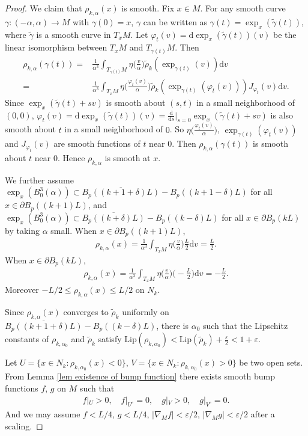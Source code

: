 \documentclass[11pt]{amsart}
\numberwithin{equation}{section}
\renewcommand{\d}{\mathrm{d}}
\begin{document}
\begin{proof}
We claim that $\rho_{k,\alpha}(x)$ is smooth. Fix $x\in M$. For any smooth curve $\gamma:(-\alpha,\alpha)\to M$ with $\gamma(0)=x$, $\gamma$ can be written as $\gamma(t)=\exp_x(\tilde\gamma(t))$, where $\tilde\gamma$ is a smooth curve in $T_xM$. Let $\varphi_t(v)=\d\exp_x(\tilde\gamma(t))(v)$ be the linear isomorphism between $T_xM$ and $T_{\gamma(t)}M$. Then 
\begin{align*}
    \rho_{k,\alpha}(\gamma(t))=&\frac{1}{\alpha^3}\int_{T_{\gamma(t)}M}\eta\Big(\frac{v}{\alpha}\Big)\tilde\rho_k(\exp_{\gamma(t)} (v))\d v\\
    =&\frac{1}{\alpha^3}\int_{T_xM}\eta\Big(\frac{\varphi_t(v)}{\alpha}\Big)\tilde\rho_k(\exp_{\gamma(t)} (\varphi_t(v)))J_{\varphi_t}(v)\d v.
\end{align*}
Since $\exp_x(\tilde\gamma(t)+sv)$ is smooth about $(s,t)$ in a small neighborhood of $(0,0)$, $\varphi_t(v)=\d\exp_x(\tilde\gamma(t))(v)=\frac{\d}{\d s}|_{s=0}\exp_x(\tilde\gamma(t)+sv)$ is also smooth about $t$ in a small neighborhood of $0$. So $\eta\Big(\frac{\varphi_t(v)}{\alpha}\Big)$, $\exp_{\gamma(t)} (\varphi_t(v))$ and $J_{\varphi_t}(v)$ are smooth functions of $t$ near $0$. Then $\rho_{k,\alpha}(\gamma(t))$ is smooth about $t$ near $0$.  Hence $\rho_{k,\alpha}$ is smooth at $x$. 

We further assume $\exp_x(B_0^3(\alpha))\subset\overline{B_p((k+1+\delta)L)}- B_p((k+1-\delta)L)$ for all $x\in\partial B_p((k+1)L)$, and $\exp_x(B_0^3(\alpha))\subset\overline{B_p((k+\delta)L)}- B_p((k-\delta)L)$ for all $x\in\partial B_p(kL)$ by taking $\alpha$ small. When $x\in\partial B_p((k+1)L)$,
\begin{align*}
    \rho_{k,\alpha}(x)=\frac{1}{\alpha^3}\int_{T_xM}\eta\Big(\frac{v}{\alpha}\Big)\frac{L}{2}\d v=\frac{L}{2}.
\end{align*}
When $x\in\partial B_p(kL)$,
\begin{align*}
    \rho_{k,\alpha}(x)=\frac{1}{\alpha^3}\int_{T_xM}\eta\Big(\frac{v}{\alpha}\Big)\Big(-\frac{L}{2}\Big)\d v=-\frac{L}{2}.
\end{align*}
Moreover $-L/2\leq \rho_{k,\alpha}(x)\leq L/2$ on $N_k$.

Since $\rho_{k,\alpha}(x)$ converges to $\tilde\rho_k$ uniformly on $\overline{B_p((k+1+\delta)L)}- B_p((k-\delta)L)$, there is $\alpha_0$ such that the Lipschitz constants of  $\rho_{k,\alpha_0}$ and $\tilde\rho_k$ satisfy $\mathrm{Lip}(\rho_{k,\alpha_0})<\mathrm{Lip}(\tilde\rho_k)+\frac{\varepsilon}{2}<1+\varepsilon$.

Let $U=\{x\in N_k:\rho_{k,\alpha_0}(x)<0\}$, $V=\{x\in N_k:\rho_{k,\alpha_0}(x)>0\}$ be two open sets. From Lemma \ref{lem existence of bump function} there exists smooth bump functions $f$, $g$ on $M$ such that
\begin{align*}
    f|_{U}>0,\quad f|_{U^c}=0, \quad g|_{V}>0,\quad g|_{V^c}=0.
\end{align*}
And we may assume $f<L/4$, $g<L/4$, $|\nabla_M f|<\varepsilon/2$, $|\nabla_M g|<\varepsilon/2$ after a scaling.


\end{proof}
\end{document}
